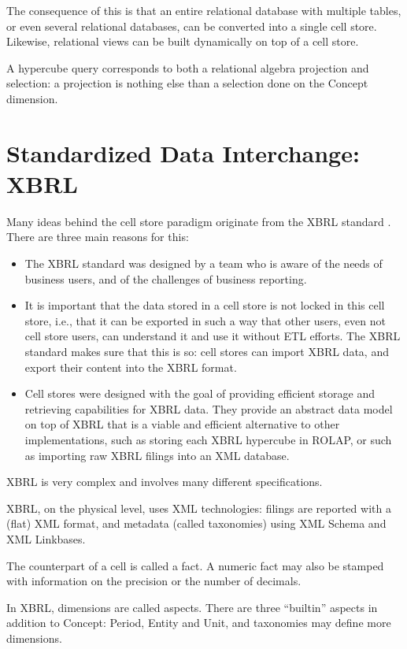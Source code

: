\documentclass{acm_proc_article-sp}
\begin{document}
The consequence of this is that an entire relational database with multiple tables, or even several relational databases, can be converted into a single cell store. Likewise, relational views can be built dynamically on top of a cell store.

A hypercube query corresponds to both a relational algebra projection and selection: a projection is nothing else than a selection done on the Concept dimension.

\section{Standardized Data Interchange: XBRL}
\label{section-xbrl-standard}
Many ideas behind the cell store paradigm originate from the XBRL standard \cite{XBRL}. There are three main reasons for this:

\begin{itemize}
\item The XBRL standard was designed by a team who is aware of the needs of business users, and of the challenges of business reporting.
\item It is important that the data stored in a cell store is not locked in this cell store, i.e., that it can be exported in such a way that other users, even not cell store users, can understand it and use it without ETL efforts. The XBRL standard makes sure that this is so: cell stores can import XBRL data, and export their content into the XBRL format.
\item Cell stores were designed with the goal of providing efficient storage and retrieving capabilities for XBRL data. They provide an abstract data model on top of XBRL that is a viable and efficient alternative to other implementations, such as storing each XBRL hypercube in ROLAP, or such as importing raw XBRL filings into an XML database.
\end{itemize}

XBRL is very complex and involves many different specifications.

XBRL, on the physical level, uses XML technologies: filings are reported with a (flat) XML format, and metadata (called taxonomies) using XML Schema and XML Linkbases.

The counterpart of a cell is called a fact. A numeric fact may also be stamped with information on the precision or the number of decimals.

In XBRL, dimensions are called aspects. There are three ``builtin'' aspects in addition to Concept: Period, Entity and Unit, and taxonomies may define more dimensions.
\end{document}
